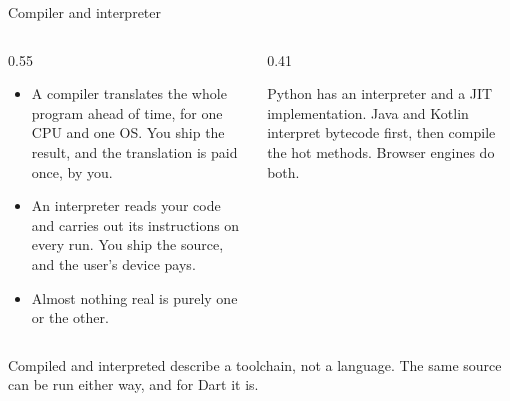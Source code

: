 \documentclass[10pt,aspectratio=169,t]{beamer}
\begin{document}
\begin{frame}[eyebrow=How code runs]{Compiler and interpreter}
  \vskip 2mm
  \begin{columns}[T]
    \begin{column}{0.55\textwidth}
      \begin{itemize}
        \item A compiler translates the whole program ahead of time, for one CPU and one OS. You ship the result, and the translation is paid once, by you.
        \item An interpreter reads your code and carries out its instructions on every run. You ship the source, and the user's device pays.
        \item Almost nothing real is purely one or the other.
      \end{itemize}
    \end{column}
    \begin{column}{0.41\textwidth}
      \begin{hint}
        Python has an interpreter and a JIT implementation. Java and Kotlin interpret bytecode first, then compile the hot methods. Browser engines do both.
      \end{hint}
    \end{column}
  \end{columns}
  \begin{takeaway}{Compiled and interpreted describe a toolchain, not a language.}
    The same source can be run either way, and for Dart it is.
  \end{takeaway}
\end{frame}
\end{document}
